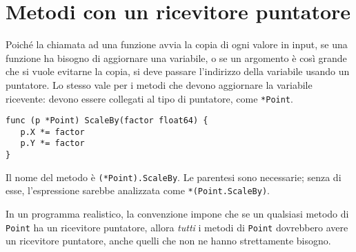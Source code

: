 \section{Metodi con un ricevitore puntatore}
\label{sec:metodi_con_un_ricevitore_puntatore}%
Poiché la chiamata ad una funzione avvia la copia di ogni valore in input, se una funzione ha bisogno di aggiornare una variabile, o se un argomento è così grande che si vuole evitarne la copia, si deve passare l'indirizzo della variabile usando un puntatore.
Lo stesso vale per i metodi che devono aggiornare la variabile ricevente: devono essere collegati al tipo di puntatore, come \verb|*Point|.
\begin{lstlisting}[frame=single, label={lst:lstlisting5-2.1}]
func (p *Point) ScaleBy(factor float64) {
   p.X *= factor
   p.Y *= factor
}
\end{lstlisting}
Il nome del metodo è \verb|(*Point).ScaleBy|.
Le parentesi sono necessarie;
senza di esse, l'espressione sarebbe analizzata come \verb|*(Point.ScaleBy)|.

In un programma realistico, la convenzione impone che se un qualsiasi metodo di \verb|Point| ha un ricevitore puntatore, allora \textit{tutti} i metodi di \verb|Point| dovrebbero avere un ricevitore puntatore, anche quelli che non ne hanno strettamente bisogno.

